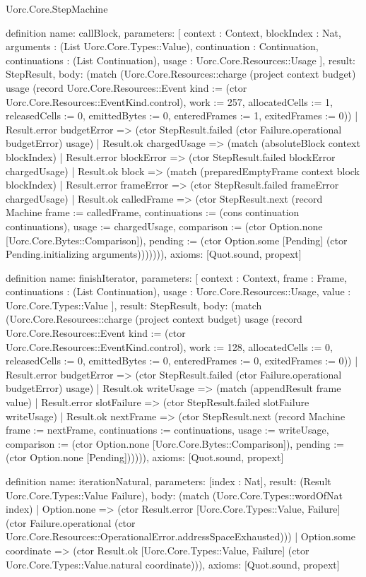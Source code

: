 \begin{lexlean}{Uorc.Core.StepMachine}
\begin{semanticmodule}
definition{
  name: callBlock,
  parameters: [
    context : Context,
    blockIndex : Nat,
    arguments : (List Uorc.Core.Types::Value),
    continuation : Continuation,
    continuations : (List Continuation),
    usage : Uorc.Core.Resources::Usage
  ],
  result: StepResult,
  body: (match (Uorc.Core.Resources::charge (project context budget) usage (record Uorc.Core.Resources::Event {kind := (ctor Uorc.Core.Resources::EventKind.control), work := 257, allocatedCells := 1, releasedCells := 0, emittedBytes := 0, enteredFrames := 1, exitedFrames := 0}))
    | Result.error budgetError => (ctor StepResult.failed (ctor Failure.operational budgetError) usage)
    | Result.ok chargedUsage => (match (absoluteBlock context blockIndex)
      | Result.error blockError => (ctor StepResult.failed blockError chargedUsage)
      | Result.ok block => (match (preparedEmptyFrame context block blockIndex)
        | Result.error frameError => (ctor StepResult.failed frameError chargedUsage)
        | Result.ok calledFrame => (ctor StepResult.next (record Machine {frame := calledFrame, continuations := (cons continuation continuations), usage := chargedUsage, comparison := (ctor Option.none [Uorc.Core.Bytes::Comparison]), pending := (ctor Option.some [Pending] (ctor Pending.initializing arguments))}))))),
  axioms: [Quot.sound, propext]
}

definition{
  name: finishIterator,
  parameters: [
    context : Context,
    frame : Frame,
    continuations : (List Continuation),
    usage : Uorc.Core.Resources::Usage,
    value : Uorc.Core.Types::Value
  ],
  result: StepResult,
  body: (match (Uorc.Core.Resources::charge (project context budget) usage (record Uorc.Core.Resources::Event {kind := (ctor Uorc.Core.Resources::EventKind.control), work := 128, allocatedCells := 0, releasedCells := 0, emittedBytes := 0, enteredFrames := 0, exitedFrames := 0}))
    | Result.error budgetError => (ctor StepResult.failed (ctor Failure.operational budgetError) usage)
    | Result.ok writeUsage => (match (appendResult frame value)
      | Result.error slotFailure => (ctor StepResult.failed slotFailure writeUsage)
      | Result.ok nextFrame => (ctor StepResult.next (record Machine {frame := nextFrame, continuations := continuations, usage := writeUsage, comparison := (ctor Option.none [Uorc.Core.Bytes::Comparison]), pending := (ctor Option.none [Pending])})))),
  axioms: [Quot.sound, propext]
}

definition{
  name: iterationNatural,
  parameters: [index : Nat],
  result: (Result Uorc.Core.Types::Value Failure),
  body: (match (Uorc.Core.Types::wordOfNat index)
    | Option.none => (ctor Result.error [Uorc.Core.Types::Value, Failure] (ctor Failure.operational (ctor Uorc.Core.Resources::OperationalError.addressSpaceExhausted)))
    | Option.some coordinate => (ctor Result.ok [Uorc.Core.Types::Value, Failure] (ctor Uorc.Core.Types::Value.natural coordinate))),
  axioms: [Quot.sound, propext]
}


\end{semanticmodule}
\end{lexlean}
